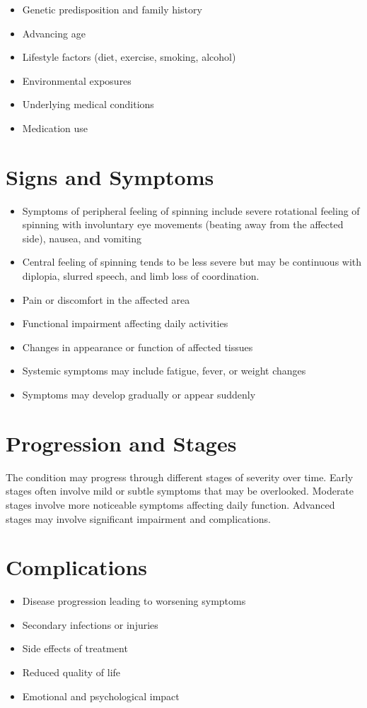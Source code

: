 \begin{itemize}[noitemsep]
  \item Genetic predisposition and family history
  \item Advancing age
  \item Lifestyle factors (diet, exercise, smoking, alcohol)
  \item Environmental exposures
  \item Underlying medical conditions
  \item Medication use
\end{itemize}
\section{Signs and Symptoms}
\begin{itemize}[noitemsep]
  \item Symptoms of peripheral feeling of spinning include severe rotational feeling of spinning with involuntary eye movements (beating away from the affected side), nausea, and vomiting
  \item Central feeling of spinning tends to be less severe but may be continuous with diplopia, slurred speech, and limb loss of coordination.
  \item Pain or discomfort in the affected area
  \item Functional impairment affecting daily activities
  \item Changes in appearance or function of affected tissues
  \item Systemic symptoms may include fatigue, fever, or weight changes
  \item Symptoms may develop gradually or appear suddenly
\end{itemize}
\section{Progression and Stages}
The condition may progress through different stages of severity over time. Early stages often involve mild or subtle symptoms that may be overlooked. Moderate stages involve more noticeable symptoms affecting daily function. Advanced stages may involve significant impairment and complications.
\section{Complications}
\begin{itemize}[noitemsep]
  \item Disease progression leading to worsening symptoms
  \item Secondary infections or injuries
  \item Side effects of treatment
  \item Reduced quality of life
  \item Emotional and psychological impact
\end{itemize}

